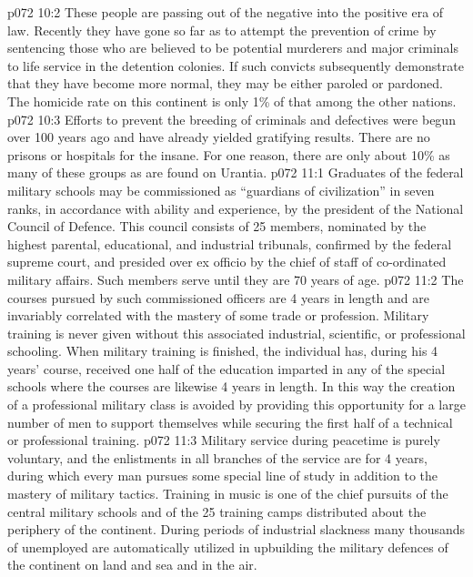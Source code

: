 \vs p072 10:2 These people are passing out of the negative into the positive era of law. Recently they have gone so far as to attempt the prevention of crime by sentencing those who are believed to be potential murderers and major criminals to life service in the detention colonies. If such convicts subsequently demonstrate that they have become more normal, they may be either paroled or pardoned. The homicide rate on this continent is only 1\% of that among the other nations.
\vs p072 10:3 Efforts to prevent the breeding of criminals and defectives were begun over 100 years ago and have already yielded gratifying results. There are no prisons or hospitals for the insane. For one reason, there are only about 10\% as many of these groups as are found on Urantia.
\vs p072 11:1 Graduates of the federal military schools may be commissioned as “guardians of civilization” in seven ranks, in accordance with ability and experience, by the president of the National Council of Defence. This council consists of 25 members, nominated by the highest parental, educational, and industrial tribunals, confirmed by the federal supreme court, and presided over ex officio by the chief of staff of co\hyp{}ordinated military affairs. Such members serve until they are 70 years of age.
\vs p072 11:2 The courses pursued by such commissioned officers are 4 years in length and are invariably correlated with the mastery of some trade or profession. Military training is never given without this associated industrial, scientific, or professional schooling. When military training is finished, the individual has, during his 4 years’ course, received one half of the education imparted in any of the special schools where the courses are likewise 4 years in length. In this way the creation of a professional military class is avoided by providing this opportunity for a large number of men to support themselves while securing the first half of a technical or professional training.
\vs p072 11:3 Military service during peacetime is purely voluntary, and the enlistments in all branches of the service are for 4 years, during which every man pursues some special line of study in addition to the mastery of military tactics. Training in music is one of the chief pursuits of the central military schools and of the 25 training camps distributed about the periphery of the continent. During periods of industrial slackness many thousands of unemployed are automatically utilized in upbuilding the military defences of the continent on land and sea and in the air.
